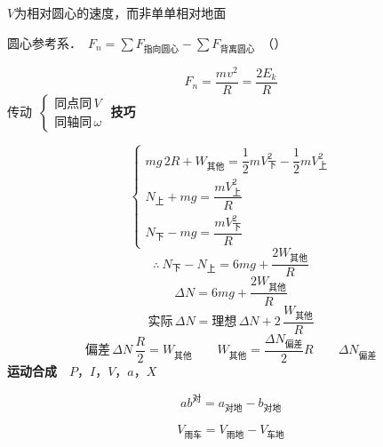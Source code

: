 $V$为相对圆心的速度，而非单单相对地面

圆心参考系．\ $F_n=\sum F_{\text{指向圆心}}-\sum F_{\text{背离圆心}}$\ （）

\[ F_n=\frac{mv^2}{R}=\frac{2E_k}{R} \]
传动\ $\begin{cases}\text{同点同}\,V\\ \text{同轴同}\,\omega\end{cases}$
\textbf{技巧}


\[
\begin{cases}
mg\,2R+W_{\text{其他}}=\dfrac{1}{2}mV_{\text{下}}^{2}-\dfrac{1}{2}mV_{\text{上}}^{2}\\[4pt]
N_{\text{上}}+mg=\dfrac{mV_{\text{上}}^{2}}{R}\\[4pt]
N_{\text{下}}-mg=\dfrac{mV_{\text{下}}^{2}}{R}
\end{cases}
\]
\[ \therefore\ N_{\text{下}}-N_{\text{上}}=6mg+\frac{2W_{\text{其他}}}{R} \]
\[ \Delta N=6mg+\frac{2W_{\text{其他}}}{R} \]
\[ \text{实际}\,\Delta N=\text{理想}\,\Delta N+2\,\frac{W_{\text{其他}}}{R} \]
\[ \text{偏差}\,\Delta N\,\frac{R}{2}=W_{\text{其他}}\qquad W_{\text{其他}}=\frac{\Delta N_{\text{偏差}}}{2}R\qquad \Delta N_{\text{偏差}} \]
\textbf{运动合成}\ \ {\footnotesize $P$，$I$，$V$，$a$，$X$}

\[ ab^{\text{对}}=a_{\text{对地}}-b_{\text{对地}} \]


\[ V_{\text{雨车}}=V_{\text{雨地}}-V_{\text{车地}} \]

